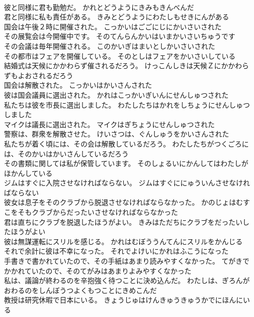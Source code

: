 \documentclass[8pt]{extreport}
\begin{document}
\begin{CJK}{UTF8}{min}
\\	彼と同様に君も勤勉だ。	かれとどうようにきみもきんべんだ 
\\	君と同様に私も責任がある。	きみとどうようにわたしもせきにんがある 
\\	国会は午後２時に開催された。	こっかいはごごにじにかいさいされた 
\\	その展覧会は今開催中です。	そのてんらんかいはいまかいさいちゅうです 
\\	その会議は毎年開催される。	このかいぎはまいとしかいさいされた 
\\	その都市はフェアを開催している。	そのとしはフェアをかいさいしている 
\\	結婚式は天候にかかわらず催されるだろう。	けっこんしきは天候Ｚにかかわらずもよおされるだろう 
\\	国会は解散された。	こっかいはかいさんされた 
\\	彼は国会議員に選出された。	かれはこっかいぎいんにせんしゅつされた 
\\	私たちは彼を市長に選出しました。	わたしたちはかれをしちょうにせんしゅつしました 
\\	マイクは議長に選出された。	マイクはぎちょうにせんしゅつされた 
\\	警察は、群衆を解散させた。	けいさつは、ぐんしゅうをかいさんされた 
\\	私たちが着く頃には、その会は解散しているだろう。	わたしたちがつくごろには、そのかいはかいさんしているだろう 
\\	その書類に関しては私が保管しています。	そのしょるいにかんしてはわたしがほかんしている 
\\	ジムはすぐに入院させなければならない。	ジムはすぐににゅういんさせなければならない 
\\	彼女は息子をそのクラブから脱退させなければならなかった。	かのじょはむすこをそもクラブからだったいさせなければならなかった 
\\	君は直ちにクラブを脱退したほうがよい。	きみはただちにクラブをだったいしたほうがよい 
\\	彼は無謀運転にスリルを感じる。	かれはむぼううんてんにスリルをかんじる 
\\	それで余計に彼は不幸になった。	それでよけいにかれはふこうになった 
\\	手書きで書かれていたので、その手紙はあまり読みやすくなかった。	てがきでかかれていたので、そのてがみはあまりよみやすくなかった 
\\	私は、議論が終わるのを辛抱強く待つことに決め込んだ。	わたしは、ぎろんがおわるのをしんぼうつよくもつことにきめこんだ 
\\	教授は研究休暇で日本にいる。	きょうじゅはけんきゅうきゅうかでにほんにいる 

\end{CJK}
\end{document}
